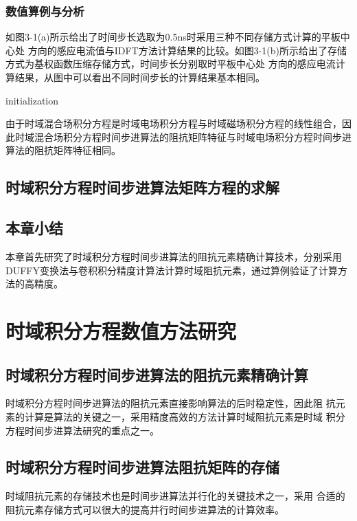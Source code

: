 \documentclass[master]{thesis-uestc}
\begin{document}
\subsection{数值算例与分析}

如图3-1(a)所示给出了时间步长选取为0.5ns时采用三种不同存储方式计算的平板中心处 方向的感应电流值与IDFT方法计算结果的比较。如图3-1(b)所示给出了存储方式为基权函数压缩存储方式，时间步长分别取时平板中心处 方向的感应电流计算结果，从图中可以看出不同时间步长的计算结果基本相同。

\begin{algorithm}[H]
 initialization\;
 \caption{How to wirte an algorithm.}
\end{algorithm}

由于时域混合场积分方程是时域电场积分方程与时域磁场积分方程的线性组合，因此时域混合场积分方程时间步进算法的阻抗矩阵特征与时域电场积分方程时间步进算法的阻抗矩阵特征相同。

\section{时域积分方程时间步进算法矩阵方程的求解}

\section{本章小结}
本章首先研究了时域积分方程时间步进算法的阻抗元素精确计算技术，分别采用DUFFY变换法与卷积积分精度计算法计算时域阻抗元素，通过算例验证了计算方法的高精度。

\chapter{时域积分方程数值方法研究}
\section{时域积分方程时间步进算法的阻抗元素精确计算}
时域积分方程时间步进算法的阻抗元素直接影响算法的后时稳定性，因此阻
抗元素的计算是算法的关键之一，采用精度高效的方法计算时域阻抗元素是时域
积分方程时间步进算法研究的重点之一。

\section{时域积分方程时间步进算法阻抗矩阵的存储}
时域阻抗元素的存储技术也是时间步进算法并行化的关键技术之一，采用
合适的阻抗元素存储方式可以很大的提高并行时间步进算法的计算效率。
\end{document}

